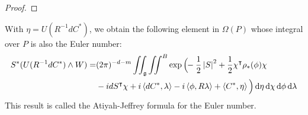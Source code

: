 \begin{proof}

\end{proof}


With $\eta=U(R^{-1}dC^*)$, we obtain the following element in $\Omega(P)$ whose
integral over $P$ is also the Euler number:
\begin{align} \label{eq:AJ_formula_euler}
S^*(U(R^{-1}dC^*)\wedge W)	
= &(2\pi)^{-d-m}\iint_{\g}\iint^B 
\exp\Big(\!\!-\frac{1}{2}\abs{S}^2+\frac{1}{2}\chi^{\intercal}\rho_*(\phi)\chi \\
	&- idS^\intercal \chi
	+i\gen{dC^*,\lambda}-i\gen{\phi,R\lambda} + \gen{C^*,\eta}\Big)  \odif{\eta}
	\odif{\chi} \odif{\phi}\odif{\lambda}  \nonumber 
\end{align}
This result is called the Atiyah-Jeffrey formula for the Euler number.

